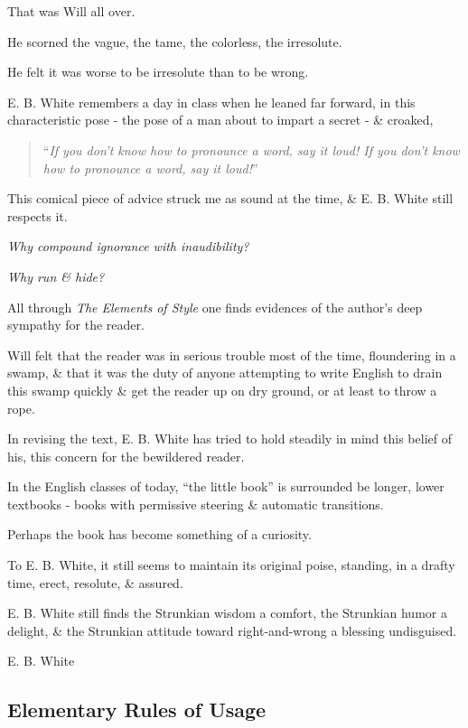 \documentclass{article}
\begin{document}
That was Will all over.

He scorned the vague, the tame, the colorless, the irresolute.

He felt it was worse to be irresolute than to be wrong.

E. B. White remembers a day in class when he leaned far forward, in this characteristic pose - the pose of a man about to impart a secret - \& croaked,
\begin{quotation}
	``{\it If you don't know how to pronounce a word, say it loud! If you don't know how to pronounce a word, say it loud!}''
\end{quotation}
This comical piece of advice struck me as sound at the time, \& E. B. White still respects it.

{\it Why compound ignorance with inaudibility?}

{\it Why run \& hide?}

%
All through {\it The Elements of Style} one finds evidences of the author's deep sympathy for the reader.

Will felt that the reader was in serious trouble most of the time, floundering in a swamp, \& that it was the duty of anyone attempting to write English to drain this swamp quickly \& get the reader up on dry ground, or at least to throw a rope.

In revising the text, E. B. White has tried to hold steadily in mind this belief of his, this concern for the bewildered reader.

%
In the English classes of today, ``the little book'' is surrounded be longer, lower textbooks - books with permissive steering \& automatic transitions.

Perhaps the book has become something of a curiosity.

To E. B. White, it still seems to maintain its original poise, standing, in a drafty time, erect, resolute, \& assured.

E. B. White still finds the Strunkian wisdom a comfort, the Strunkian humor a delight, \& the Strunkian attitude toward right-and-wrong a blessing undisguised.

\begin{flushright}
	E. B. White
\end{flushright}


\subsection{Elementary Rules of Usage}
\end{document}
